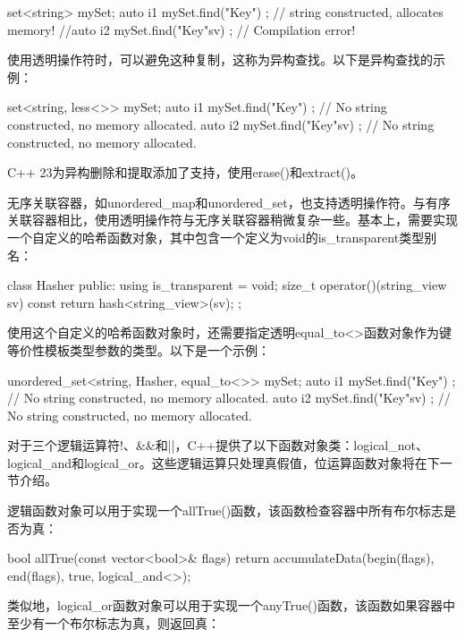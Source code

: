 \begin{cpp}
set<string> mySet;
auto i1 { mySet.find("Key") }; // string constructed, allocates memory!
//auto i2 { mySet.find("Key"sv) }; // Compilation error!
\end{cpp}

使用透明操作符时，可以避免这种复制，这称为异构查找。以下是异构查找的示例：

\begin{cpp}
set<string, less<>> mySet;
auto i1 { mySet.find("Key") }; // No string constructed, no memory allocated.
auto i2 { mySet.find("Key"sv) }; // No string constructed, no memory allocated.
\end{cpp}

C++ 23为异构删除和提取添加了支持，使用erase()和extract()。

无序关联容器，如unordered\_map和unordered\_set，也支持透明操作符。与有序关联容器相比，使用透明操作符与无序关联容器稍微复杂一些。基本上，需要实现一个自定义的哈希函数对象，其中包含一个定义为void的is\_transparent类型别名：

\begin{cpp}
class Hasher
{
    public:
        using is_transparent = void;
        size_t operator()(string_view sv) const { return hash<string_view>{}(sv); }
};
\end{cpp}

使用这个自定义的哈希函数对象时，还需要指定透明equal\_to<>函数对象作为键等价性模板类型参数的类型。以下是一个示例：

\begin{cpp}
unordered_set<string, Hasher, equal_to<>> mySet;
auto i1 { mySet.find("Key") }; // No string constructed, no memory allocated.
auto i2 { mySet.find("Key"sv) }; // No string constructed, no memory allocated.
\end{cpp}


对于三个逻辑运算符!、\&\&和||，C++提供了以下函数对象类：logical\_not、logical\_and和logical\_or。这些逻辑运算只处理真假值，位运算函数对象将在下一节介绍。

逻辑函数对象可以用于实现一个allTrue()函数，该函数检查容器中所有布尔标志是否为真：

\begin{cpp}
bool allTrue(const vector<bool>& flags)
{
    return accumulateData(begin(flags), end(flags), true, logical_and<>{});
}
\end{cpp}

类似地，logical\_or函数对象可以用于实现一个anyTrue()函数，该函数如果容器中至少有一个布尔标志为真，则返回真：

